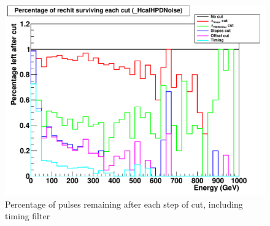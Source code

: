 \begin{figure}
   \includegraphics[width=120mm]{DailyLog/6364/6364_RecHitEnergyRatioPlot_HcalHPDNoise}
   \caption{Percentage of pulses remaining after each step of cut, including timing filter}
   \label{Figure_6364_CleanedPercentageWithTiming}
\end{figure}


